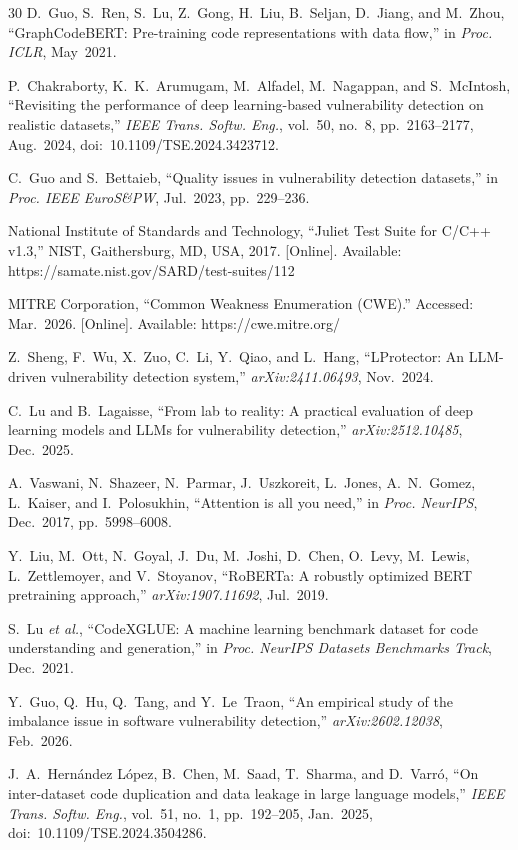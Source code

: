\documentclass{ieeeaccess}
\begin{document}
\begin{thebibliography}{30}
 D.~Guo, S.~Ren, S.~Lu, Z.~Gong, H.~Liu, B.~Seljan, D.~Jiang, and M.~Zhou, ``GraphCodeBERT: Pre-training code representations with data flow,'' in \emph{Proc. ICLR}, May~2021.

 P.~Chakraborty, K.~K.~Arumugam, M.~Alfadel, M.~Nagappan, and S.~McIntosh, ``Revisiting the performance of deep learning-based vulnerability detection on realistic datasets,'' \emph{IEEE Trans. Softw. Eng.}, vol.~50, no.~8, pp.~2163--2177, Aug.~2024, doi:~10.1109/TSE.2024.3423712.

 C.~Guo and S.~Bettaieb, ``Quality issues in vulnerability detection datasets,'' in \emph{Proc. IEEE EuroS\&PW}, Jul.~2023, pp.~229--236.

 National Institute of Standards and Technology, ``Juliet Test Suite for C/C++ v1.3,'' NIST, Gaithersburg, MD, USA, 2017. [Online]. Available: https://samate.nist.gov/SARD/test-suites/112

 MITRE Corporation, ``Common Weakness Enumeration (CWE).'' Accessed: Mar.~2026. [Online]. Available: https://cwe.mitre.org/

 Z.~Sheng, F.~Wu, X.~Zuo, C.~Li, Y.~Qiao, and L.~Hang, ``LProtector: An LLM-driven vulnerability detection system,'' \emph{arXiv:2411.06493}, Nov.~2024.

 C.~Lu and B.~Lagaisse, ``From lab to reality: A practical evaluation of deep learning models and LLMs for vulnerability detection,'' \emph{arXiv:2512.10485}, Dec.~2025.

 A.~Vaswani, N.~Shazeer, N.~Parmar, J.~Uszkoreit, L.~Jones, A.~N.~Gomez, L.~Kaiser, and I.~Polosukhin, ``Attention is all you need,'' in \emph{Proc. NeurIPS}, Dec.~2017, pp.~5998--6008.

 Y.~Liu, M.~Ott, N.~Goyal, J.~Du, M.~Joshi, D.~Chen, O.~Levy, M.~Lewis, L.~Zettlemoyer, and V.~Stoyanov, ``RoBERTa: A robustly optimized BERT pretraining approach,'' \emph{arXiv:1907.11692}, Jul.~2019.

 S.~Lu \emph{et al.}, ``CodeXGLUE: A machine learning benchmark dataset for code understanding and generation,'' in \emph{Proc. NeurIPS Datasets Benchmarks Track}, Dec.~2021.

 Y.~Guo, Q.~Hu, Q.~Tang, and Y.~Le~Traon, ``An empirical study of the imbalance issue in software vulnerability detection,'' \emph{arXiv:2602.12038}, Feb.~2026.

 J.~A.~Hern\'andez L\'opez, B.~Chen, M.~Saad, T.~Sharma, and D.~Varr\'o, ``On inter-dataset code duplication and data leakage in large language models,'' \emph{IEEE Trans. Softw. Eng.}, vol.~51, no.~1, pp.~192--205, Jan.~2025, doi:~10.1109/TSE.2024.3504286.


\end{thebibliography}
\end{document}
